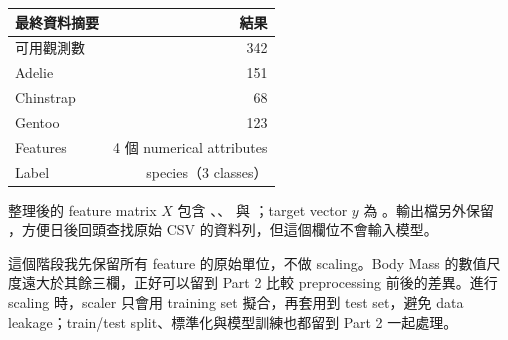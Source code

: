\begin{table}[H]
\centering
\small
\begin{tabular}{lr}
\toprule
\textbf{最終資料摘要} & \textbf{結果} \\
\midrule
可用觀測數 & 342 \\
Adelie & 151 \\
Chinstrap & 68 \\
Gentoo & 123 \\
Features & 4 個 numerical attributes \\
Label & species（3 classes） \\
\bottomrule
\end{tabular}
\end{table}

整理後的 feature matrix $X$ 包含 、、 與 ；target vector $y$ 為 。輸出檔另外保留 ，方便日後回頭查找原始 CSV 的資料列，但這個欄位不會輸入模型。

這個階段我先保留所有 feature 的原始單位，不做 scaling。Body Mass 的數值尺度遠大於其餘三欄，正好可以留到 Part 2 比較 preprocessing 前後的差異。進行 scaling 時，scaler 只會用 training set 擬合，再套用到 test set，避免 data leakage；train/test split、標準化與模型訓練也都留到 Part 2 一起處理。
